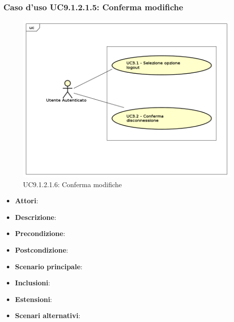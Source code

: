 					\subsubsection{Caso d'uso UC9.1.2.1.5: Conferma modifiche}
					\label{UC9.1.2.1.6}
					\begin{figure}[h]
						\centering
					\includegraphics[scale=0.7,keepaspectratio]{UML/UC9.png}
						\caption{UC9.1.2.1.6: Conferma modifiche}
					\end{figure}
					\FloatBarrier
					\begin{itemize}
						\item \textbf{Attori}: 
						\item \textbf{Descrizione}: 
						\item \textbf{Precondizione}: 
						\item \textbf{Postcondizione}: 
						\item \textbf{Scenario principale}:
						\item \textbf{Inclusioni}:
						\item \textbf{Estensioni}:
						\item \textbf{Scenari alternativi}:
					\end{itemize}
										
